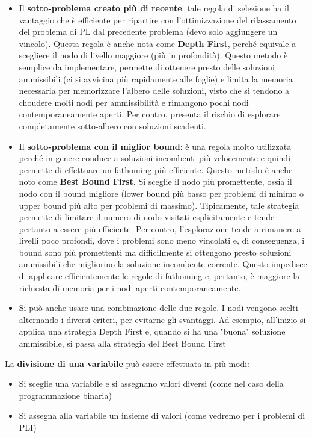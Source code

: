 \documentclass[12pt]{article}
\begin{document}
\begin{itemize}
    \item Il \textbf{sotto-problema creato più di recente}: tale regola di selezione ha il vantaggio che è efficiente
    per ripartire con l'ottimizzazione del rilassamento del problema di PL dal precedente problema (devo solo aggiungere un vincolo).
    Questa regola è anche nota come \textbf{Depth First}, perché equivale a scegliere il nodo di livello maggiore (più in profondità).
    Questo metodo è semplice da implementare, permette di ottenere presto delle soluzioni ammissibili (ci si avvicina più rapidamente alle foglie) e limita la memoria necessaria per memorizzare l'albero delle
    soluzioni, visto che si tendono a choudere molti nodi per ammissibilità e rimangono pochi nodi contemporaneamente aperti. Per contro, presenta il rischio di esplorare completamente sotto-albero con soluzioni scadenti.
    \item Il \textbf{sotto-problema con il miglior bound}: è una regola molto utilizzata perché in genere conduce a soluzioni incombenti più velocemente e quindi
    permette di effettuare un fathoming più efficiente. Questo metodo è anche noto come \textbf{Best Bound First}. Si sceglie il nodo più promettente, ossia il nodo con il bound migliore (lower bound più basso per problemi di minimo o 
    upper bound più alto per problemi di massimo). Tipicamente, tale strategia permette di limitare il numero di nodo visitati esplicitamente e tende pertanto a essere più efficiente.
    Per contro, l'esplorazione tende a rimanere a livelli poco profondi, dove i problemi sono meno vincolati e, di conseguenza, i bound sono più promettenti ma difficilmente si ottengono presto soluzioni ammissibili che migliorino la soluzione incombente corrente.
    Questo impedisce di applicare efficientemente le regole di fathoming e, pertanto, è maggiore la richiesta di memoria per i nodi aperti contemporaneamente.
    \item Si può anche usare una combinazione delle due regole. I nodi vengono scelti alternando i diversi criteri, per evitarne gli svantaggi. Ad esempio, all'inizio si applica una strategia Depth First e, quando si ha una "buona" soluzione ammissibile, si passa alla strategia del Best Bound First
\end{itemize}
La \textbf{divisione di una variabile} può essere effettuata in più modi:
\begin{itemize}
    \item Si sceglie una variabile e si assegnano valori diversi (come nel caso della programmazione binaria)
    \item Si assegna alla variabile un insieme di valori (come vedremo per i problemi di PLI)
\end{itemize}
\end{document}
